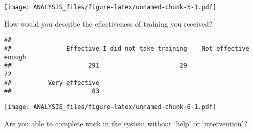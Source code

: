 \documentclass[]{article}
\newenvironment{Shaded}{\begin{snugshade}}{\end{snugshade}}
\newcommand{\KeywordTok}[1]{\textcolor[rgb]{0.13,0.29,0.53}{\textbf{#1}}}
\newcommand{\DataTypeTok}[1]{\textcolor[rgb]{0.13,0.29,0.53}{#1}}
\newcommand{\DecValTok}[1]{\textcolor[rgb]{0.00,0.00,0.81}{#1}}
\newcommand{\FloatTok}[1]{\textcolor[rgb]{0.00,0.00,0.81}{#1}}
\newcommand{\StringTok}[1]{\textcolor[rgb]{0.31,0.60,0.02}{#1}}
\newcommand{\OperatorTok}[1]{\textcolor[rgb]{0.81,0.36,0.00}{\textbf{#1}}}
\newcommand{\NormalTok}[1]{#1}
\begin{document}
\begin{Shaded}
\end{Shaded}

\texttt{[image: ANALYSIS\_files/figure-latex/unnamed-chunk-5-1.pdf]}

How would you describe the effectiveness of training you received?

\begin{Shaded}
\end{Shaded}

\begin{verbatim}
## 
##               Effective I did not take training    Not effective enough 
##                     291                      29                      72 
##          Very effective 
##                      83
\end{verbatim}

\begin{Shaded}
\end{Shaded}

\texttt{[image: ANALYSIS\_files/figure-latex/unnamed-chunk-6-1.pdf]}

Are you able to complete work in the system without `help' or
`intervention'?
\end{document}
